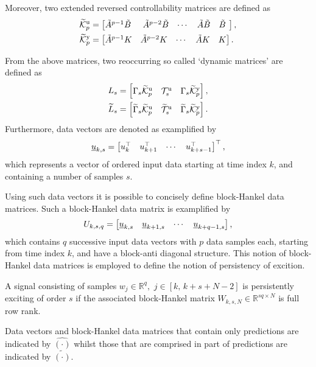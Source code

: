 Moreover, two extended reversed controllability matrices are defined as 
\begin{align*}
\tKp{u} &= \begin{bmatrix} \tilde{A}^{p-1}\tilde{B}\:\, & \tilde{A}^{p-2}\tilde{B} & \cdots & \tilde{A}\tilde{B} & \tilde{B}\:\, \end{bmatrix},\\%
\tKp{y} &= \begin{bmatrix} \tilde{A}^{p-1}K & \tilde{A}^{p-2}K & \cdots & \tilde{A}K & K \end{bmatrix}.
\end{align*}

From the above matrices, two reoccurring so called `dynamic matrices' are defined as
\begin{align*}
    L_s &= \begin{bmatrix} \Gamma_s\tKp{u} & \mathcal{T}_s^\mathrm{u} & \Gamma_s\tKp{y} \end{bmatrix},\\%
    \widetilde{L}_s &= \begin{bmatrix} \widetilde{\Gamma}_s\tKp{u} & \widetilde{\mathcal{T}}_s^\mathrm{u} & \widetilde{\Gamma}_s\tKp{y} \end{bmatrix}.
\end{align*}
%
Furthermore, data vectors are denoted as examplified by
\begin{align*}
    \underline{u}_{k,s} = \begin{bmatrix} u_k^\top & u_{k+1}^\top & \cdots & u_{k+s-1}^\top\end{bmatrix}^\top,
\end{align*}
which represents a vector of ordered input data starting at time index $k$, and containing a number of samples $s$.

Using such data vectors it is possible to concisely define block-Hankel data matrices. Such a block-Hankel data matrix is examplified by
\begin{align*}
    U_{k,s,q} = \begin{bmatrix}
        \underline{u}_{k,s} & \underline{u}_{k+1,s} & \cdots & \underline{u}_{k+q-1,s}
    \end{bmatrix},
\end{align*}
which contains $q$ successive input data vectors with $p$ data samples each, starting from time index $k$, and have a block-anti diagonal structure. This notion of block-Hankel data matrices is employed to define the notion of persistency of excition.
\begin{defn}\label{def:PE}
    A signal consisting of samples ${w_j\in\mathbb{R}^q},$ $j\in[k,\,k+s+N-2]$ is persistently exciting of order $s$ if the associated block-Hankel matrix ${W_{k,s,N}\in\mathbb{R}^{sq \times N}}$ is full row rank.
\end{defn}
Data vectors and block-Hankel data matrices that contain only predictions are indicated by $\hat{(\cdot)}$ whilst those that are comprised in part of predictions are indicated by $\tilde{(\cdot)}$.


